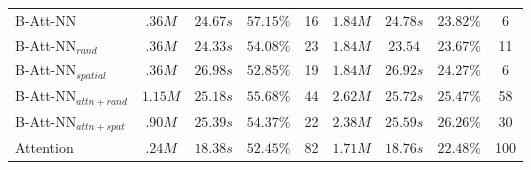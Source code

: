 \documentclass{article}
\begin{document}
\begin{table}[h]
\begin{threeparttable}
\begin{tabular*}{\textwidth}{@{\extracolsep\fill}l|cccc|cccc}
      \midrule 
      B-Att-NN                        & \(.36M\) & \(24.67s\) & \(57.15\%\) & 16
                                      & \(1.84M\) & \(24.78s\) & \(23.82\%\) & 6\\
      B-Att-NN\(_{rand}\)             & \(.36M\) & \(24.33s\) & \(54.08\%\) & 23
                                      & \(1.84M\) & \(23.54\) & \(23.67\%\) & 11\\
      B-Att-NN\(_{spatial}\)          & \(.36M\) & \(26.98s\) & \(52.85\%\) & 19
                                      & \(1.84M\) & \(26.92s\) & \(24.27\%\) & 6\\
      B-Att-NN\(_{attn+rand}\)        & \(1.15M\) & \(25.18s\) & \(55.68\%\) & 44
                                      & \(2.62M\) & \(25.72s\) & \(25.47\%\) & 58\\
      B-Att-NN\(_{attn+spat}\)        & \(.90M\) & \(25.39s\) & \(54.37\%\) & 22
                                      & \(2.38M\) & \(25.59s\) & \(26.26\%\) & 30\\
                                            
      \midrule
      Attention                       & \(.24M\) & \(18.38s\) & \(52.45\%\) & 82
                                      & \(1.71M\) & \(18.76s\) & \(22.48\%\) & 100\\

      \bottomrule
    \end{tabular*}


    
  \end{threeparttable}
\end{table}
\end{document}
